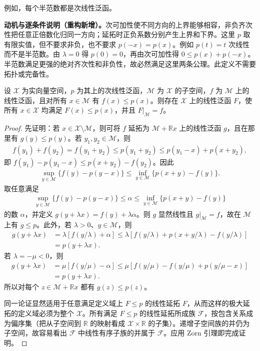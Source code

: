 \documentclass[../../main.tex]{subfiles}
\begin{document}
例如，每个半范数都是次线性泛函。
\begin{remark}
\textbf{动机与逐条件说明（重构新增）。}次可加性使不同方向的上界能够相容，非负齐次性把任意正倍数化归同一方向；延拓时正负系数分别产生上界和下界。这里 $p$ 取有限实值，但不要求非负，也不要求 $p(-x)=p(x)$。例如 $p(t)=t$ 次线性而不是半范数。由 $\lambda=0$ 得 $p(0)=0$，再由次可加性得 $0\le p(x)+p(-x)$。半范数满足更强的绝对齐次性和非负性，故必然满足这里两条公理。此定义不需要拓扑或完备性。
\end{remark}
\begin{theorem}\label{theorem:ch05-real-hahn-banach}
设 $\mathcal X$ 为实向量空间，$p$ 为其上的次线性泛函，$\mathcal M$ 为 $\mathcal X$ 的子空间，$f$ 为 $\mathcal M$ 上的线性泛函，且对所有 $x\in\mathcal M$ 有 $f(x)\le p(x)$。则存在 $\mathcal X$ 上的线性泛函 $F$，使所有 $x\in\mathcal X$ 均满足 $F(x)\le p(x)$，并且 $F|_{\mathcal M}=f$。
\end{theorem}
\begin{proof}
先证明：若 $x\in\mathcal X\setminus\mathcal M$，则可将 $f$ 延拓为 $\mathcal M+\mathbb Rx$ 上的线性泛函 $g$，且在那里有 $g(y)\le p(y)$。若 $y_1,y_2\in\mathcal M$，则
\begin{align*}
f(y_1)+f(y_2)=f(y_1+y_2)\le p(y_1+y_2)\le p(y_1-x)+p(x+y_2),
\end{align*}
即 $f(y_1)-p(y_1-x)\le p(x+y_2)-f(y_2)$。因此
\begin{align*}
\sup_{y\in\mathcal M}\{f(y)-p(y-x)\}\le\inf_{y\in\mathcal M}\{p(x+y)-f(y)\}.
\end{align*}
取任意满足
\begin{align*}
\sup_{y\in\mathcal M}\{f(y)-p(y-x)\}\le\alpha\le\inf_{y\in\mathcal M}\{p(x+y)-f(y)\}
\end{align*}
的数 $\alpha$，并定义 $g(y+\lambda x)=f(y)+\lambda\alpha$。则 $g$ 显然线性且 $g|_{\mathcal M}=f$，故在 $\mathcal M$ 上有 $g\le p$。此外，若 $\lambda>0$、$y\in\mathcal M$，则
\begin{align*}
g(y+\lambda x)&=\lambda[f(y/\lambda)+\alpha]\le\lambda[f(y/\lambda)+p(x+y/\lambda)-f(y/\lambda)]\\
&=p(y+\lambda x).
\end{align*}
若 $\lambda=-\mu<0$，则
\begin{align*}
g(y+\lambda x)&=\mu[f(y/\mu)-\alpha]\le\mu[f(y/\mu)-f(y/\mu)+p(y/\mu-x)]\\
&=p(y+\lambda x).
\end{align*}
所以对每个 $z\in\mathcal M+\mathbb Rx$ 都有 $g(z)\le p(z)$。

同一论证显然适用于任意满足定义域上 $F\le p$ 的线性延拓 $F$，从而这样的极大延拓的定义域必须为整个 $\mathcal X$。所有满足 $F\le p$ 的线性延拓所成族 $\mathscr F$，按包含关系成为偏序集（把从子空间到 $\mathbb R$ 的映射看成 $\mathcal X\times\mathbb R$ 的子集）。递增子空间族的并仍为子空间，故容易看出 $\mathscr F$ 中线性有序子族的并属于 $\mathscr F$。应用 Zorn 引理即完成证明。
\end{proof}
\end{document}
